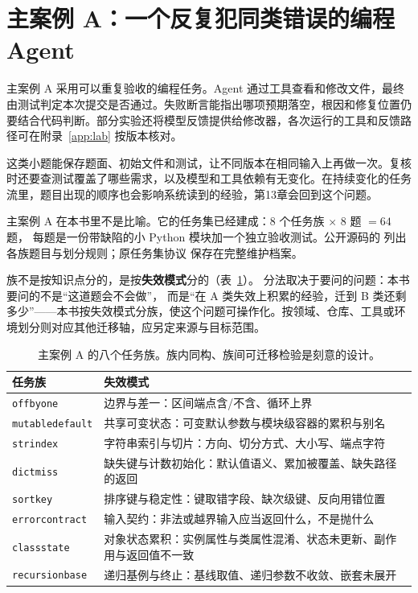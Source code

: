 \section{主案例 A：一个反复犯同类错误的编程 Agent}
\label{sec:caseA}

主案例 A 采用可以重复验收的编程任务。Agent 通过工具查看和修改文件，最终由测试判定本次提交是否通过。失败断言能指出哪项预期落空，根因和修复位置仍要结合代码判断。部分实验还将模型反馈提供给修改器，各次运行的工具和反馈路径可在附录~\ref{app:lab} 按版本核对。

这类小题能保存题面、初始文件和测试，让不同版本在相同输入上再做一次。复核时还要查测试覆盖了哪些需求，以及模型和工具依赖有无变化。在持续变化的任务流里，题目出现的顺序也会影响系统读到的经验，第13章会回到这个问题。

主案例 A 在本书里不是比喻。它的任务集已经建成：8 个任务族 $\times$ 8 题 $=64$ 题，
每题是一份带缺陷的小 Python 模块加一个独立验收测试。公开源码的  列出各族题目与划分规则；原任务集协议  保存在完整维护档案。

族不是按知识点分的，是按\textbf{失效模式}分的（表~\ref{tab:families}）。
分法取决于要问的问题：本书要问的不是“这道题会不会做”，
而是“在 A 类失效上积累的经验，迁到 B 类还剩多少”——本书按失效模式分族，使这个问题可操作化。按领域、仓库、工具或环境划分则对应其他迁移轴，应另定来源与目标范围。

\begin{table}[htbp]
\centering
\small
\begin{tabular}{@{}p{3.0cm}p{9.4cm}@{}}
\toprule
任务族 & 失效模式 \\
\midrule
\texttt{offbyone} & 边界与差一：区间端点含/不含、循环上界 \\
\texttt{mutabledefault} & 共享可变状态：可变默认参数与模块级容器的累积与别名 \\
\texttt{strindex} & 字符串索引与切片：方向、切分方式、大小写、端点字符 \\
\texttt{dictmiss} & 缺失键与计数初始化：默认值语义、累加被覆盖、缺失路径的返回 \\
\texttt{sortkey} & 排序键与稳定性：键取错字段、缺次级键、反向用错位置 \\
\texttt{errorcontract} & 输入契约：非法或越界输入应当返回什么，不是抛什么 \\
\texttt{classstate} & 对象状态累积：实例属性与类属性混淆、状态未更新、副作用与返回值不一致 \\
\texttt{recursionbase} & 递归基例与终止：基线取值、递归参数不收敛、嵌套未展开 \\
\bottomrule
\end{tabular}
\caption{主案例 A 的八个任务族。族内同构、族间可迁移检验是刻意的设计。}
\label{tab:families}
\end{table}

